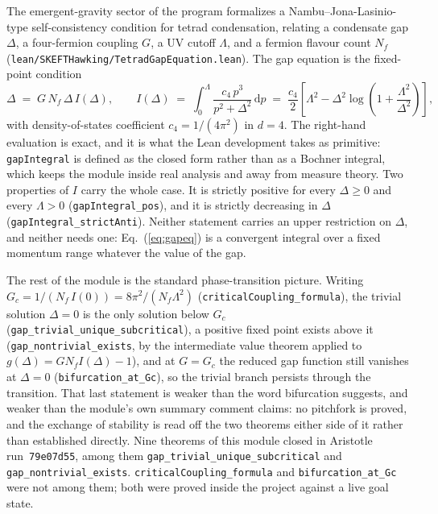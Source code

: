\documentclass[11pt]{article}
\begin{document}
The emergent-gravity sector of the program formalizes a
Nambu--Jona-Lasinio-type self-consistency condition for tetrad
condensation, relating a condensate gap $\Delta$, a four-fermion
coupling $G$, a UV cutoff $\Lambda$, and a fermion flavour count $N_f$
(\texttt{lean/SKEFTHawking/TetradGapEquation.lean}). The gap equation
is the fixed-point condition
\begin{equation}
  \Delta \;=\; G\,N_f\,\Delta\,I(\Delta),
  \qquad
  I(\Delta) \;=\; \int_0^{\Lambda} \frac{c_4\,p^3}{p^2+\Delta^2}\,\mathrm{d}p
  \;=\; \frac{c_4}{2}\left[\Lambda^2 - \Delta^2
        \log\!\left(1+\frac{\Lambda^2}{\Delta^2}\right)\right],
  \label{eq:gapeq}
\end{equation}
with density-of-states coefficient $c_4 = 1/(4\pi^2)$ in $d=4$. The
right-hand evaluation is exact, and it is what the Lean development
takes as primitive: \texttt{gapIntegral} is defined as the closed form
rather than as a Bochner integral, which keeps the module inside real
analysis and away from measure theory. Two properties of $I$ carry the
whole case. It is strictly positive for every $\Delta \geq 0$ and every
$\Lambda > 0$ (\texttt{gapIntegral\_pos}), and it is strictly
decreasing in $\Delta$ (\texttt{gapIntegral\_strictAnti}). Neither
statement carries an upper restriction on $\Delta$, and neither
needs one: Eq.~(\ref{eq:gapeq}) is a convergent integral over a fixed
momentum range whatever the value of the gap.

The rest of the module is the standard phase-transition picture.
Writing $G_c = 1/(N_f\,I(0)) = 8\pi^2/(N_f\Lambda^2)$
(\texttt{criticalCoupling\_formula}), the trivial solution $\Delta = 0$
is the only solution below $G_c$
(\texttt{gap\_trivial\_unique\_subcritical}), a positive fixed point
exists above it (\texttt{gap\_nontrivial\_exists}, by the intermediate
value theorem applied to $g(\Delta) = G N_f I(\Delta) - 1$), and at
$G = G_c$ the reduced gap function still vanishes at $\Delta = 0$
(\texttt{bifurcation\_at\_Gc}), so the trivial branch persists through
the transition. That last statement is weaker than the word
bifurcation suggests, and weaker than the module's own summary comment
claims: no pitchfork is proved, and the exchange of stability is read
off the two theorems either side of it rather than established
directly. Nine theorems of this module closed in Aristotle
run~\texttt{79e07d55}, among them
\texttt{gap\_trivial\_unique\_subcritical} and
\texttt{gap\_nontrivial\_exists}. \texttt{criticalCoupling\_formula}
and \texttt{bifurcation\_at\_Gc} were not among them; both were proved
inside the project against a live goal state.
\end{document}
